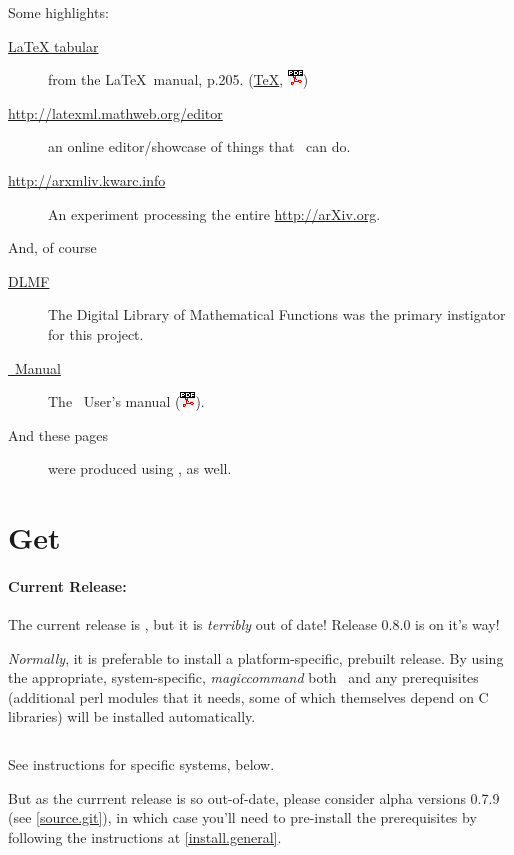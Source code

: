 \documentclass{article}
\newcommand{\PDFIcon}{\includegraphics{pdf}}
\begin{document}
Some highlights:
\begin{description}
\item[\href{examples/tabular/tabular.html}{LaTeX tabular}]
    from the \LaTeX\ manual, p.205.
    (\href{examples/tabular/tabular.tex}{\TeX},
     \href{examples/tabular/tabular.pdf}{\PDFIcon})
\item[\url{http://latexml.mathweb.org/editor}] an online editor/showcase
  of things that \LaTeXML\ can do.
\item[\url{http://arxmliv.kwarc.info}] An experiment processing
  the entire \url{http://arXiv.org}.
\end{description}
And, of course
\begin{description}
\item[\href{http://dlmf.nist.gov/}{DLMF}]
   The Digital Library of Mathematical Functions was the
   primary instigator for this project.
\item[\href{manual/}{\LaTeXML\ Manual}]
   The \LaTeXML\ User's manual (\href{manual.pdf}{\PDFIcon}).
\item[And these pages] were produced using \LaTeXML, as well.
\end{description}

\section{Get \LaTeXML}\label{get}
\paragraph{Current Release:}\label{download.current}
The current release is ,
but it is \emph{terribly} out of date!
Release 0.8.0 is on it's way!

\emph{Normally}, it is preferable to install a platform-specific, prebuilt release.
By using the appropriate, system-specific, \textit{magiccommand}
both \LaTeXML\ and any prerequisites
(additional perl modules that it needs, some of which themselves depend on C libraries)
will be installed automatically.
\begin{lstlisting}[style=shell]
%magiccommand% LaTeXML
\end{lstlisting}
See instructions for specific systems, below.

But as the currrent release is so out-of-date,
please consider alpha versions 0.7.9 (see \ref{source.git}),
in which case you'll need to pre-install the prerequisites
by following the instructions at \ref{install.general}.
\end{document}
